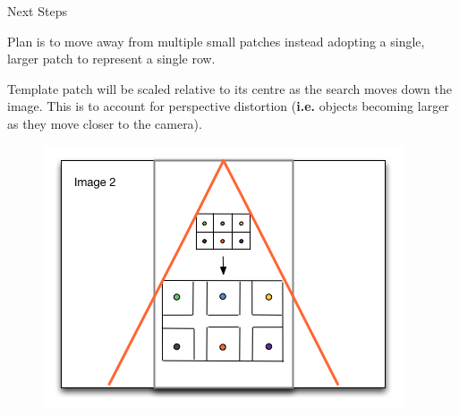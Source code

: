 \documentclass[10pt, compress]{beamer}
\begin{document}
\begin{frame}{Next Steps}

Plan is to move away from multiple small patches instead adopting a single, larger patch to represent a single row. \\ \vspace{0.5cm}

Template patch will be scaled relative to its centre as the search moves down the image. This is to account for perspective distortion (\textbf{i.e.} objects becoming larger as they move closer to the camera).

\begin{figure}[ht!]
\centering
\includegraphics[scale=0.4]{scaling.png}
\end{figure}
	
\end{frame}

\end{document}
